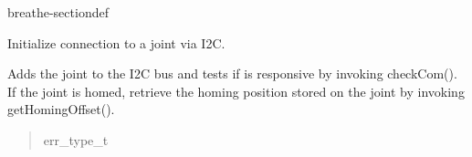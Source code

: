 \documentclass[letterpaper,10pt,english]{sphinxmanual}
\begin{document}
\begin{fulllineitems}
\begin{sphinxuseclass}{breathe-sectiondef}
\begin{fulllineitems}
\label{\detokenize{code/bioscara_hardware_drivers/index:_CPPv4N25bioscara_hardware_drivers25bioscara_hardware_drivers5Joint4initEv}}\label{\detokenize{code/bioscara_hardware_drivers/index:_CPPv3N25bioscara_hardware_drivers25bioscara_hardware_drivers5Joint4initEv}}\label{\detokenize{code/bioscara_hardware_drivers/index:_CPPv2N25bioscara_hardware_drivers25bioscara_hardware_drivers5Joint4initEv}}\label{\detokenize{code/bioscara_hardware_drivers/index:bioscara_hardware_drivers::bioscara_hardware_drivers::Joint::init__void}}
\pysigstartsignatures
\pysigstartmultiline
\pysiglinewithargsret
{\label{\detokenize{code/bioscara_hardware_drivers/index:classbioscara__hardware__drivers_1_1Joint_1aca63d0af8ba889417a16bc15510a565b}}}
{}
{}
\pysigstopmultiline
\pysigstopsignatures
\sphinxAtStartPar
Initialize connection to a joint via I2C. 

\sphinxAtStartPar
Adds the joint to the I2C bus and tests if is responsive by invoking checkCom(). If the joint is homed, retrieve the homing position stored on the joint by invoking getHomingOffset().
\begin{quote}\begin{description}
\sphinxAtStartPar
err\_type\_t 

\end{description}\end{quote}

\end{fulllineitems}



\end{sphinxuseclass}
\end{fulllineitems}
\end{document}
